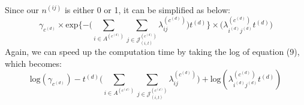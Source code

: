 \documentclass[a4paper]{article}
\begin{document}
  	Since our $n^{(ij)}$ is either 0 or 1, it can be simplified as below:
  	\begin{equation} \gamma_{c^{(d)}}\times \mbox{exp}\Big\{{-\big(\sum\limits_{i \in A^{(c^{(d)})}}\sum\limits_{j\in \mathcal{J}^{(c^{(d)})}_{(i, t)}}\lambda_{ij}^{(c^{(d)})}\big)t^{(d)}}\Big\}\times \Big(\lambda_{i^{(d)}j^{(d)}}^{(c^{(d)})}t^{(d)}\Big)
  	   \end{equation}
  	  Again, we can speed up the computation time by taking the log of equation (9), which becomes:
  	 \begin{equation}
  \mbox{log}(\gamma_{c^{(d)}})-t^{(d)}\big(\sum\limits_{i \in A^{(c^{(d)})}}\sum\limits_{j\in \mathcal{J}^{(c^{(d)})}_{(i, t)}}\lambda_{ij}^{(c^{(d)})}\big)+\mbox{log}(\lambda_{i^{(d)}j^{(d)}}^{(c^{(d)})}t^{(d)})
  	 \end{equation}
  	
\end{document}
